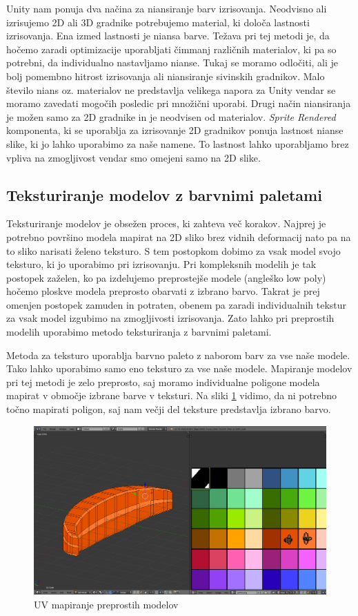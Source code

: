 \documentclass[12pt,a4paper,twoside]{book}
\begin{document}
Unity nam ponuja dva načina za niansiranje barv izrisovanja. Neodvisno ali izrisujemo 2D ali 3D gradnike potrebujemo material, ki določa lastnosti izrisovanja. Ena izmed lastnosti je niansa barve. Težava pri tej metodi je, da hočemo zaradi optimizacije uporabljati čimmanj različnih materialov, ki pa so potrebni, da individualno nastavljamo nianse. Tukaj se moramo odločiti, ali je bolj pomembno hitrost izrisovanja ali niansiranje sivinskih gradnikov. Malo število nians oz. materialov ne predstavlja velikega napora za Unity vendar se moramo zavedati mogočih posledic pri množični uporabi. Drugi način niansiranja je možen samo za 2D gradnike in je neodvisen od materialov. \textit{Sprite Rendered} komponenta, ki se uporablja za izrisovanje 2D gradnikov ponuja lastnost nianse slike, ki jo lahko uporabimo za naše namene. To lastnost lahko uporabljamo brez vpliva na zmogljivost vendar smo omejeni samo na 2D slike.

\subsection{Teksturiranje modelov z barvnimi paletami}
Teksturiranje modelov je obsežen proces, ki zahteva več korakov. Najprej je potrebno površino modela mapirat na 2D sliko brez vidnih deformacij nato pa na to sliko narisati želeno teksturo. S tem postopkom dobimo za vsak model svojo teksturo, ki jo uporabimo pri izrisovanju. Pri kompleksnih modelih je tak postopek zaželen, ko pa izdelujemo preprostejše modele (angleško low poly) hočemo ploskve modela preprosto obarvati z izbrano barvo. Takrat je prej omenjen postopek zamuden in potraten, obenem pa zaradi individualnih tekstur za vsak model izgubimo na zmogljivosti izrisovanja. Zato lahko pri preprostih modelih uporabimo metodo teksturiranja z barvnimi paletami.

Metoda za teksturo uporablja barvno paleto z naborom barv za vse naše modele. Tako lahko uporabimo samo eno teksturo za vse naše modele. Mapiranje modelov pri tej metodi je zelo preprosto, saj moramo individualne poligone modela mapirat v območje izbrane barve v teksturi. Na sliki \ref{slika:texturePalette} vidimo, da ni potrebno točno mapirati poligon, saj nam večji del teksture predstavlja izbrano barvo. 

\begin{figure}[h]
	\centering
	\includegraphics[width=14cm]{texturePalette}
	\caption{UV mapiranje preprostih modelov}
	\label{slika:texturePalette}
\end{figure}
\end{document}
